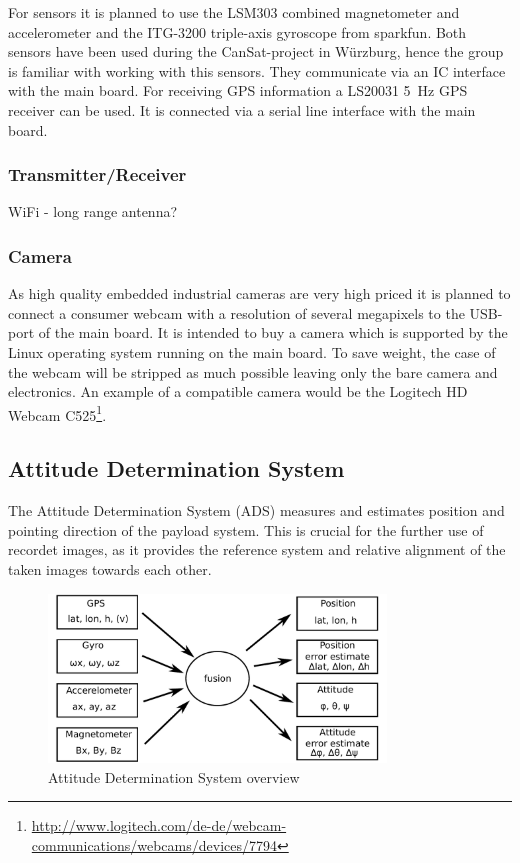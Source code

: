 \documentclass[fontsize=11pt,paper=a4,]{scrartcl}
\begin{document}
For sensors it is planned to use the LSM303 \cite{LSM303:datasheet} combined magnetometer and accelerometer and the ITG-3200 triple-axis gyroscope \cite{ITG-3200:datasheet} from sparkfun. Both sensors have been used during the CanSat-project in Würzburg, hence the group is familiar with working with this sensors. They communicate via an I{\texttwosuperior}C interface with the main board. For receiving GPS information a LS20031 5~Hz GPS receiver \cite{LS20031:datasheet} can be used. It is connected via a serial line interface with the main board.


\subsubsection*{Transmitter/Receiver}
WiFi - long range antenna?


\subsubsection*{Camera}

As high quality embedded industrial cameras are very high priced it is planned to connect a consumer webcam with a resolution of several megapixels to the USB-port of the main board. It is intended to buy a camera which is supported by the Linux operating system running on the main board. To save weight, the case of the webcam will be stripped as much possible leaving only the bare camera and electronics. An example of a compatible camera would be the Logitech HD Webcam C525\footnote{\url{http://www.logitech.com/de-de/webcam-communications/webcams/devices/7794}}.


\FloatBarrier
\subsection{Attitude Determination System}
The Attitude Determination System (ADS) measures and estimates position and pointing direction of the payload system.
This is crucial for the further use of recordet images, as it provides the reference system and relative alignment of the taken images towards each other.
\begin{figure}
\centering
\includegraphics[width=0.8\textwidth]{figures/ADS_diagram.pdf}
\caption{Attitude Determination System overview}
\label{fig:ADS_overview}
\end{figure}
\end{document}
